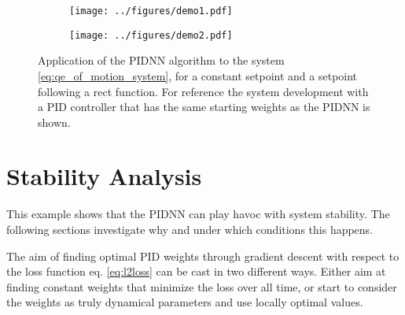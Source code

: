 \documentclass{article}
\begin{document}
    \begin{figure}[tb]
    \begin{subfigure}[c]{0.5\textwidth}
        \texttt{[image: ../figures/demo1.pdf]}
        \label{fig:demo:converging}
    \end{subfigure}
    \begin{subfigure}[c]{0.5\textwidth}
        \texttt{[image: ../figures/demo2.pdf]}
        \label{fig:demo:diverging}
    \end{subfigure}
    \caption{Application of the PIDNN algorithm to the system \eqref{eq:qe_of_motion_system}, for a constant setpoint 
    and a setpoint following a rect function. For reference
    the system development with a PID controller that has the same starting weights as the PIDNN is shown.}
    \label{fig:demo}
    \end{figure}














  \section{Stability Analysis}
    This example shows that the PIDNN can play havoc with system stability. The following sections investigate why and 
    under which conditions this happens. 

    The aim of finding optimal PID weights through gradient descent with respect to the loss function eq. 
    \eqref{eq:l2loss} can be cast in two different ways. Either aim at finding constant weights that minimize the loss 
    over all time, or start to consider the weights as truly dynamical parameters and use locally optimal values.
\end{document}
